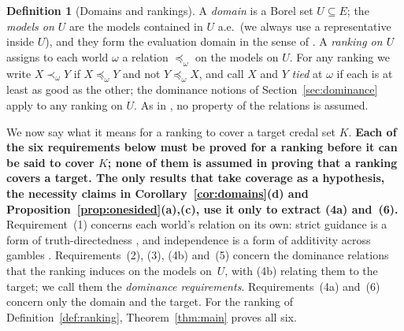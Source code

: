 \documentclass[11pt]{article}
\theoremstyle{plain}
\theoremstyle{definition}
\newtheorem{definition}[theorem]{Definition}
\theoremstyle{remark}
\begin{document}
\begin{definition}[Domains and rankings]\label{def:domains-rankings}
A \emph{domain} is a Borel set $U\subseteq E$; the \emph{models on $U$} are the models
contained in $U$ a.e.\ (we always use a representative inside $U$), and they form the evaluation
domain in the sense of \cite{KCMcompanion}. A \emph{ranking on $U$} assigns to each world
$\omega$ a relation $\preceq_\omega$ on the models on $U$. For any ranking we write $X\prec_\omega
Y$ if $X\preceq_\omega Y$ and not $Y\preceq_\omega X$, and call $X$ and $Y$ \emph{tied} at
$\omega$ if each is at least as good as the other; the dominance notions of
Section~\ref{sec:dominance} apply to any ranking on $U$. As in \cite{KCMcompanion}, no property of
the relations is assumed.
\end{definition}

We now say what it means for a ranking to cover a target credal set $K$. \textbf{Each of the
six requirements below must be proved for a ranking before it can be said to cover $K$; none of them is assumed in proving that a ranking covers a target. The only results that take coverage as a hypothesis, the necessity claims in Corollary~\ref{cor:domains}(d) and Proposition~\ref{prop:onesided}(a),(c), use it only to extract (4a) and~(6).} Requirement~(1)
concerns each world's relation on its own: strict guidance is a form of truth-directedness
\cite{Joyce}, and independence is a form of additivity across gambles \cite{Pettigrew}.
Requirements~(2), (3), (4b) and~(5) concern the dominance relations that the ranking induces on
the models on~$U$, with (4b) relating them to the target; we call them the \emph{dominance
requirements}. Requirements~(4a) and~(6) concern only the domain and the target. For the ranking
of Definition~\ref{def:ranking}, Theorem~\ref{thm:main} proves all six.
\end{document}
